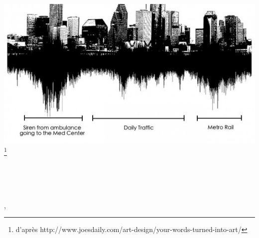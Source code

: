 \begin{titlepage}
    \begin{addmargin}[-1cm]{-3cm}
    \begin{center}
        \large  

        \hfill

        \vfill

        \begingroup
            \color{Maroon}\spacedallcaps{\myTitle} \\ \bigskip
        \endgroup
		\medskip 
		\mySubtitle \\ \bigskip

		\vfill
		
        \includegraphics[scale=.5]{gfx/title/citySound.jpg}\footnote{d'après http://www.joesdaily.com/art-design/your-words-turned-into-art/} \\ \medskip
		
		\vfill
		
        \spacedlowsmallcaps{\myName}

        \vfill
        
        \myDegree \\ \bigskip
        
        \myDepartment \\                            
        \myFaculty \\
        \myUni , \myLocation\\ \bigskip
		
		\vfill 
		
        \myTime 

        \vfill                      

    \end{center}  
  \end{addmargin}       
\end{titlepage}   